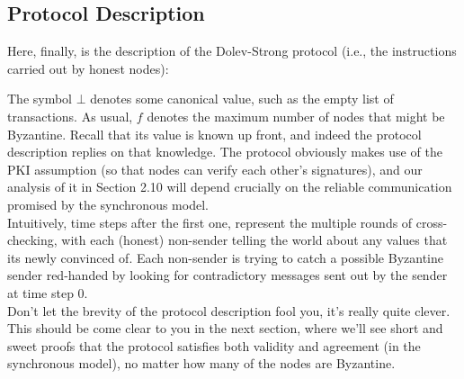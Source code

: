 
\subsection{Protocol Description}
Here, finally, is the description of the Dolev-Strong protocol (i.e., the instructions carried
out by honest nodes):



The symbol $\bot$ denotes some canonical value, such as the empty list of transactions. As
usual, $f$ denotes the maximum number of nodes that might be Byzantine. Recall that its
value is known up front, and indeed the protocol description replies on that knowledge.
The protocol obviously makes use of the PKI assumption (so that nodes can verify each
other’s signatures), and our analysis of it in Section 2.10 will depend crucially on the reliable
communication promised by the synchronous model.\\
Intuitively, time steps after the first one, represent the multiple rounds of cross-checking, with
each (honest) non-sender telling the world about any values that its newly convinced of.
Each non-sender is trying to catch a possible Byzantine sender red-handed by looking for
contradictory messages sent out by the sender at time step 0.\\
Don’t let the brevity of the protocol description fool you, it’s really quite clever. This
should be come clear to you in the next section, where we’ll see short and sweet proofs that
the protocol satisfies both validity and agreement (in the synchronous model), no matter
how many of the nodes are Byzantine.

